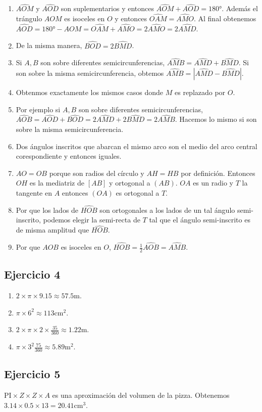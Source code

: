\begin{enumerate}
\item $\widehat{AOM}$ y $\widehat{AOD}$ son suplementarios y entonces
  $\widehat{AOM} + \widehat{AOD} = 180°$.
  Además el trángulo $AOM$ es isoceles en $O$ y entonces
  $\widehat{OAM} = \widehat{AMO}$. Al final obtenemos
  $\widehat{AOD} = 180° - \widehat{AOM} = \widehat{OAM} + \widehat{AMO}
  = 2 \widehat{AMO} = 2 \widehat{AMD}$.
\item De la misma manera,
  $\widehat{BOD} = 2 \widehat{BMD}$.
\item Si $A,B$ son sobre diferentes semicircunferencias,
  $\widehat{AMB} = \widehat{AMD} + \widehat{BMD}$. Si son sobre
  la misma semicircunferencia, obtemos
  $\widehat{AMB} = \left|\widehat{AMD} - \widehat{BMD}\right|$.
\item Obtenmos exactamente los mismos casos donde $M$ es replazado por $O$.
\item Por ejemplo si $A,B$ son sobre diferentes semicircunferencias,
  $\widehat{AOB} = \widehat{AOD} + \widehat{BOD} = 
  2\widehat{AMD} +  2\widehat{BMD} = 2\widehat{AMB}$. Hacemos lo mismo si
  son sobre la misma semicircunferencia.
\item Dos ángulos inscritos que abarcan el mismo arco son el medio del
  arco central corespondiente y entonces iguales.
\item $AO = OB$ porque son radios del círculo y
  $AH = HB$ por definición. Entonces $OH$ es la mediatriz de $[AB]$ y
  ortogonal a $(AB)$. $OA$ es un radio y $T$ la tangente en $A$ entonces
  $(OA)$ es ortogonal a $T$.
\item Por que los lados de $\widehat{HOB}$ son ortogonales a los lados de
  un tal ángulo semi-inscrito, podemos elegir la semi-recta de $T$ tal que
  el ángulo semi-inscrito es de misma amplitud que $\widehat{HOB}$.
\item Por que $AOB$ es isoceles en $O$,
  $\widehat{HOB} = \frac{1}{2} \widehat{AOB} = \widehat{AMB}$.
\end{enumerate}

\subsection{Ejercicio 4}

\begin{enumerate}
\item $2 \times \pi \times 9.15 \approx 57.5$m.
\item $\pi \times 6^2 \approx 113 \text{cm}^2$.
\item $2 \times \pi \times 2 \times \frac{35}{360} \approx 1.22$m.
\item $\pi \times 3^2 \frac{75}{360} \approx 5.89 \text{m}^2$.
\end{enumerate}



\subsection{Ejercicio 5}

$\mathrm{PI} \times Z \times Z \times A$ es una aproximación del volumen
de la pizza. Obtenemos
$3.14 \times 0.5 \times 13 = 20.41 \text{cm}^3$.

